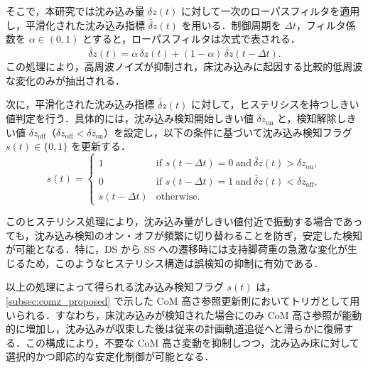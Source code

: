 そこで，本研究では沈み込み量 $\delta z(t)$ に対して一次のローパスフィルタを適用し，平滑化された沈み込み指標 $\tilde{\delta z}(t)$ を用いる．制御周期を $\Delta t$，フィルタ係数を $\alpha \in (0,1)$ とすると，ローパスフィルタは次式で表される．
\begin{equation}
\tilde{\delta z}(t)=\alpha\,\delta z(t)+(1-\alpha)\,\tilde{\delta z}(t-\Delta t).
\label{eq:sink_lpf}
\end{equation}
この処理により，高周波ノイズが抑制され，床沈み込みに起因する比較的低周波な変化のみが抽出される．

次に，平滑化された沈み込み指標 $\tilde{\delta z}(t)$ に対して，ヒステリシスを持つしきい値判定を行う．具体的には，沈み込み検知開始しきい値 $\delta z_{\mathrm{on}}$ と，検知解除しきい値 $\delta z_{\mathrm{off}}$（$\delta z_{\mathrm{off}} < \delta z_{\mathrm{on}}$）を設定し，以下の条件に基づいて沈み込み検知フラグ $s(t)\in\{0,1\}$ を更新する．
\begin{equation}
s(t)=
\begin{cases}
1 & \text{if } s(t-\Delta t)=0 \ \text{and}\ \tilde{\delta z}(t)>\delta z_{\mathrm{on}},\\
0 & \text{if } s(t-\Delta t)=1 \ \text{and}\ \tilde{\delta z}(t)<\delta z_{\mathrm{off}},\\
s(t-\Delta t) & \text{otherwise}.
\end{cases}
\label{eq:sink_hysteresis}
\end{equation}

このヒステリシス処理により，沈み込み量がしきい値付近で振動する場合であっても，沈み込み検知のオン・オフが頻繁に切り替わることを防ぎ，安定した検知が可能となる．特に，DS から SS への遷移時には支持脚荷重の急激な変化が生じるため，このようなヒステリシス構造は誤検知の抑制に有効である．

以上の処理によって得られる沈み込み検知フラグ $s(t)$ は，\cref{subsec:comz_proposed} で示した CoM 高さ参照更新則においてトリガとして用いられる．すなわち，床沈み込みが検知された場合にのみ CoM 高さ参照が能動的に増加し，沈み込みが収束した後は従来の計画軌道追従へと滑らかに復帰する．この構成により，不要な CoM 高さ変動を抑制しつつ，沈み込み床に対して選択的かつ即応的な安定化制御が可能となる．

